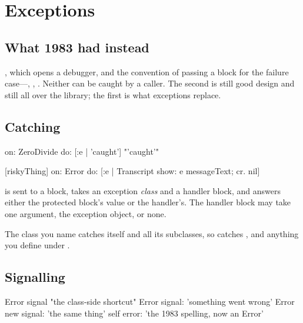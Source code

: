 \chapter{Exceptions}
\label{ch:exceptions}


\section{What 1983 had instead}

, which opens a debugger, and the convention of passing a
block for the failure case---,
, . Neither can be caught by a caller. The
second is still good design and still all over the library; the first is what
exceptions replace.

\section{Catching}

\begin{st}
[1/0] on: ZeroDivide do: [:e | 'caught']            "'caught'"

[riskyThing]
    on: Error
    do: [:e | Transcript show: e messageText; cr. nil]
\end{st}

 is sent to a block, takes an exception \emph{class} and a handler
block, and answers either the protected block's value or the handler's. The
handler block may take one argument, the exception object, or none.

The class you name catches itself and all its subclasses, so 
catches ,  and anything you define
under .

\section{Signalling}

\begin{st}
Error signal                              "the class-side shortcut"
Error signal: 'something went wrong'
Error new signal: 'the same thing'
self error: 'the 1983 spelling, now an Error'
\end{st}

